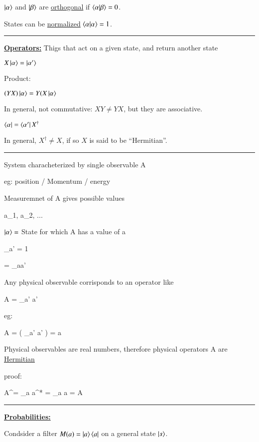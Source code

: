 {$\ket{\alpha}$ and $\ket{\beta}$ are \underline{orthogonal} if $\braket{\alpha|\beta} = 0$.

States can be \underline{normalized} $\braket{\alpha|\alpha} = 1$.

\noindent\rule{\textwidth}{1pt}

\textbf{\underline{Operators:}} Thigs that act on a given state, and return another state

$X\ket{\alpha} = \ket{\alpha'}$

Product:

$(YX)\ket{\alpha} = Y(X\ket{\alpha}$

In general, not commutative:  $XY \neq YX$, but they are associative.


$\bra{\alpha} = \bra{\alpha'}X^\dagger$

In general, $X^\dagger \neq X$,  if so $X$ is said to be ``Hermitian''.

\noindent\rule{\textwidth}{1pt}

System characheterized by single observable A

eg: position / Momentum / energy

Measuremnet of A gives possible values

\be
a_1, a_2, ...
\ee

$\ket{\alpha} = $  State for which A has a value of a

\be
\sum\limits_{a'}  = 1 
\ee

\be
{} = \delta_{aa'}
\ee

Any physical observable corrisponds to an operator like

\be
A = \sum\limits_{a'} a'   
\ee

eg: 


\be
A\ket{\alpha} = \left( \sum\limits_{a'} a'  \right)\ket{\alpha} = a \ket{\alpha}
\ee

Physical observables are real numbers, therefore physical operators A are \underline{Hermitian}

proof:

\be
A^\dagger = \sum\limits_{a} a^* \ket{\alpha}\bra{\alpha} = \sum\limits_{a} a \ket{\alpha}\bra{\alpha} = A
\ee

\noindent\rule{\textwidth}{1pt}

\textbf{\underline{Probabilities:}}

Condsider a filter $M(a) = \ket{a}\bra{a}$ on a general state $\ket{s}$.

}
